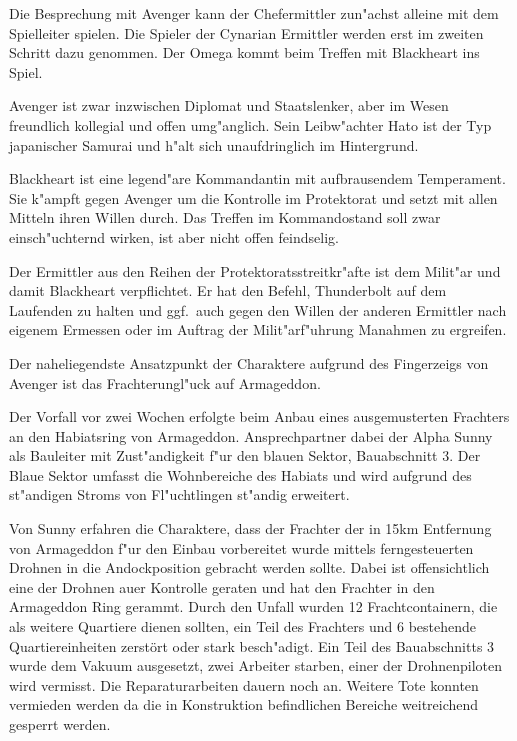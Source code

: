 \begin{remarks}
	Die Besprechung mit Avenger kann der Chefermittler zun"achst alleine mit dem Spielleiter spielen. Die Spieler der Cynarian Ermittler werden erst im zweiten Schritt dazu genommen. Der Omega kommt beim Treffen mit Blackheart ins Spiel.
	
	Avenger ist zwar inzwischen Diplomat und Staatslenker, aber im Wesen freundlich kollegial und offen umg"anglich. Sein Leibw"achter Hato ist der Typ japanischer Samurai und h"alt sich unaufdringlich im Hintergrund.
	
	Blackheart ist eine legend"are Kommandantin mit aufbrausendem Temperament. Sie k"ampft gegen Avenger um die Kontrolle im Protektorat und setzt mit allen Mitteln ihren Willen durch. Das Treffen im Kommandostand soll zwar einsch"uchternd wirken, ist aber nicht offen feindselig.
	
	Der Ermittler aus den Reihen der Protektoratsstreitkr"afte ist dem Milit"ar und damit Blackheart verpflichtet. Er hat den Befehl, Thunderbolt auf dem Laufenden zu halten und ggf.~auch gegen den Willen der anderen Ermittler nach eigenem Ermessen oder im Auftrag der Milit"arf"uhrung Ma\3nahmen zu ergreifen.
\end{remarks}


Der naheliegendste Ansatzpunkt der Charaktere aufgrund des Fingerzeigs von Avenger ist das Frachterungl"uck auf Armageddon.

Der Vorfall vor zwei Wochen erfolgte beim Anbau eines ausgemusterten Frachters an den Habiatsring von Armageddon. Ansprechpartner dabei der Alpha Sunny als Bauleiter mit Zust"andigkeit f"ur den blauen Sektor, Bauabschnitt 3. Der Blaue Sektor umfasst die Wohnbereiche des Habiats und wird aufgrund des st"andigen Stroms von Fl"uchtlingen st"andig erweitert.

Von Sunny erfahren die Charaktere, dass der Frachter der in 15km Entfernung von Armageddon f"ur den Einbau vorbereitet wurde mittels ferngesteuerten Drohnen in die Andockposition gebracht werden sollte. Dabei ist offensichtlich eine der Drohnen au\3er Kontrolle geraten und hat den Frachter in den Armageddon Ring gerammt. Durch den Unfall wurden 12 Frachtcontainern, die als weitere Quartiere dienen sollten, ein Teil des Frachters und 6 bestehende Quartiereinheiten zerstört oder stark besch"adigt. Ein Teil des Bauabschnitts 3 wurde dem Vakuum ausgesetzt, zwei Arbeiter starben, einer der Drohnenpiloten wird vermisst. Die Reparaturarbeiten dauern noch an. Weitere Tote konnten vermieden werden da die in Konstruktion befindlichen Bereiche weitreichend gesperrt werden.

